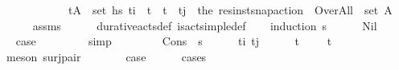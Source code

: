 \begin{isabellebody}
\ \ \ \ \ \ \ \ \ \ \ \ {\isacharparenleft}{\kern0pt}{\isasymexists}{\isacharparenleft}{\kern0pt}t{\isacharprime}{\kern0pt}{\isacharcomma}{\kern0pt}A{\isacharparenright}{\kern0pt}\ {\isasymin}\ set\ hs{\isachardot}{\kern0pt}\ t\isactrlsub i\ {\isacharless}{\kern0pt}\ t{\isacharprime}{\kern0pt}\ {\isasymand}\ t{\isacharprime}{\kern0pt}\ {\isacharless}{\kern0pt}\ t\isactrlsub j\ {\isasymand}\ {\isacharparenleft}{\kern0pt}the\ {\isacharparenleft}{\kern0pt}res{\isacharunderscore}{\kern0pt}inst{\isacharunderscore}{\kern0pt}snap{\isacharunderscore}{\kern0pt}action\ {\isasympi}\ Over{\isacharunderscore}{\kern0pt}All{\isacharparenright}{\kern0pt}{\isacharparenright}{\kern0pt}\ {\isasymin}\ set\ A{\isacharparenright}{\kern0pt}{\isachardoublequoteclose}\isanewline
%
\isadelimproof
\ \ \ \ %
\endisadelimproof
%
\isatagproof
{}\isamarkupfalse%
\ assms\isanewline
\ \ \ \ \isamarkupfalse%
\ durative{\isacharunderscore}{\kern0pt}acts{\isacharunderscore}{\kern0pt}def\ is{\isacharunderscore}{\kern0pt}act{\isacharunderscore}{\kern0pt}simple{\isacharunderscore}{\kern0pt}def\isanewline
\ \ \isamarkupfalse%
\ {\isacharparenleft}{\kern0pt}induction\ {\isasympi}s{\isacharparenright}{\kern0pt}\isanewline
\ \ \ \ \isamarkupfalse%
\ Nil\isanewline
\ \ \ \ \isamarkupfalse%
\ \isamarkupfalse%
\ {\isacharquery}{\kern0pt}case\ \isanewline
\ \ \ \ \ \ \isamarkupfalse%
\ simp\isanewline
\ \ \isamarkupfalse%
\isanewline
\ \ \ \ \isamarkupfalse%
\ {\isacharparenleft}{\kern0pt}Cons\ {\isasympi}\ {\isasympi}s{\isacharparenright}{\kern0pt}\isanewline
\ \ \ \ \isamarkupfalse%
\ t\isactrlsub i\ t\isactrlsub j\isanewline
\ \ \ \ \isamarkupfalse%
\ t\isactrlsub {\isasympi}\ {\isasympi}{\isacharprime}{\kern0pt}\ \ {\isachardoublequoteopen}{\isasympi}\ {\isacharequal}{\kern0pt}\ {\isacharparenleft}{\kern0pt}t\isactrlsub {\isasympi}{\isacharcomma}{\kern0pt}{\isasympi}{\isacharprime}{\kern0pt}{\isacharparenright}{\kern0pt}{\isachardoublequoteclose}\isanewline
\ \ \ \ \ \ \isamarkupfalse%
\ {\isacharparenleft}{\kern0pt}meson\ surj{\isacharunderscore}{\kern0pt}pair{\isacharparenright}{\kern0pt}\isanewline
\ \ \ \ \isamarkupfalse%
\ \isamarkupfalse%
\ {\isacharquery}{\kern0pt}case\isanewline
\ \ \ \ \isamarkupfalse%
\ {\isacharparenleft}{\kern0pt}cases\ {\isasympi}{\isacharprime}{\kern0pt}{\isacharparenright}{\kern0pt}\isanewline

\end{isabellebody}
